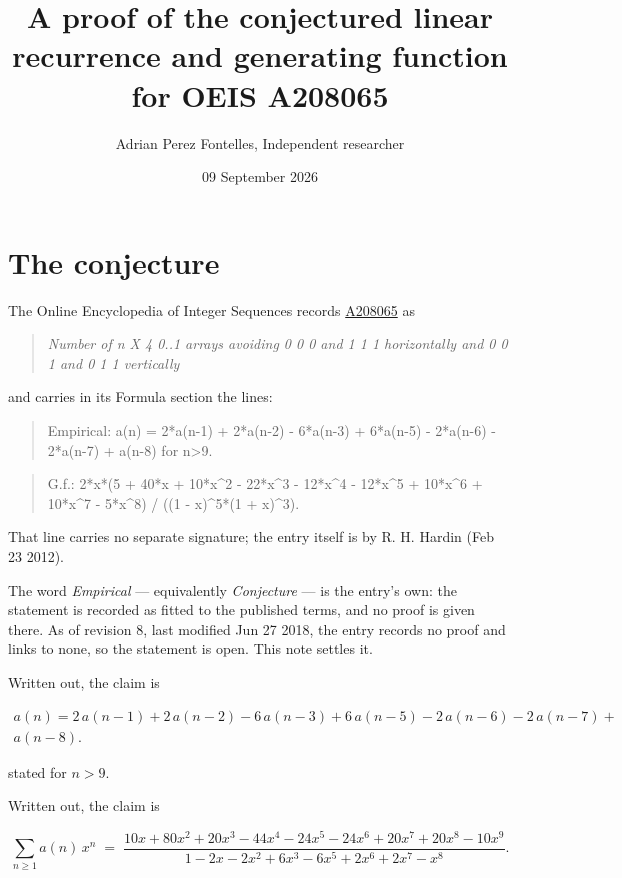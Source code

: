 \documentclass[11pt]{article}
\title{A proof of the conjectured linear recurrence and generating function for OEIS A208065}
\author{Adrian Perez Fontelles, Independent researcher}
\date{09 September 2026}
\theoremstyle{definition}
\begin{document}
\maketitle
\section{The conjecture}

The Online Encyclopedia of Integer Sequences records \href{https://oeis.org/A208065}{A208065} as

\begin{quote}\itshape Number of n X 4 0..1 arrays avoiding 0 0 0 and 1 1 1 horizontally and 0 0 1 and 0 1 1 vertically\end{quote}

and carries in its Formula section the lines:

\begin{quote}\ttfamily Empirical: a(n) = 2*a(n-1) + 2*a(n-2) - 6*a(n-3) + 6*a(n-5) - 2*a(n-6) - 2*a(n-7) + a(n-8) for n>9.\end{quote}

\begin{quote}\ttfamily G.f.: 2*x*(5 + 40*x + 10*x\textasciicircum{}2 - 22*x\textasciicircum{}3 - 12*x\textasciicircum{}4 - 12*x\textasciicircum{}5 + 10*x\textasciicircum{}6 + 10*x\textasciicircum{}7 - 5*x\textasciicircum{}8) / ((1 - x)\textasciicircum{}5*(1 + x)\textasciicircum{}3).\end{quote}

That line carries no separate signature; the entry itself is by R. H. Hardin (Feb 23 2012).

The word {\itshape Empirical} --- equivalently {\itshape Conjecture} --- is the entry's own: the statement is recorded as fitted to the published terms, and no proof is given there. As of revision 8, last modified Jun 27 2018, the entry records no proof and links to none, so the statement is open. This note settles it.

Written out, the claim is

\begin{multline*} a(n) = 2\,a(n-1) + 2\,a(n-2) - 6\,a(n-3) + 6\,a(n-5) - 2\,a(n-6) - 2\,a(n-7) + \\ a(n-8). \end{multline*}

stated for $n > 9$.

Written out, the claim is

\[\sum_{n \ge 1} a(n)\,x^n \;=\; \frac{10x + 80x^{2} + 20x^{3} - 44x^{4} - 24x^{5} - 24x^{6} + 20x^{7} + 20x^{8} - 10x^{9}}{1 - 2x - 2x^{2} + 6x^{3} - 6x^{5} + 2x^{6} + 2x^{7} - x^{8}}.\]
\end{document}
